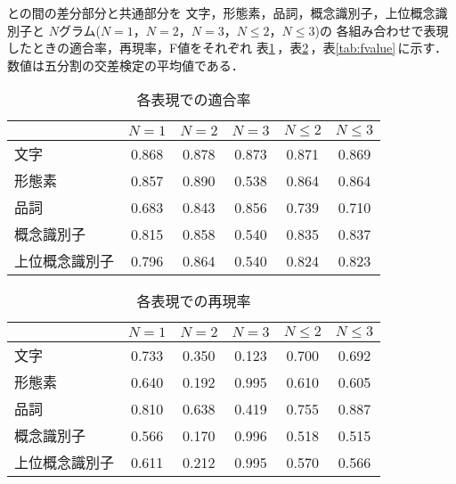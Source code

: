 {\CT}と{\NT}の間の差分部分と共通部分を
文字，形態素，品詞，概念識別子，上位概念識別子と
$N$グラム($N = 1$，$N = 2$，$N = 3$，$N \le 2$，$N \le 3$)の
各組み合わせで表現したときの適合率，再現率，F値をそれぞれ
表\ref{tab:pre}\,，表\ref{tab:rec}\,，表\ref{tab:fvalue}\,に示す． 
数値は五分割の交差検定の平均値である．
\begin{table}[htbp]
\caption{各表現での適合率}
\label{tab:pre}
\begin{center}
\begin{tabular}{|l|c|c|c|c|c|}\hline
& $N = 1$ & $N = 2$ & $N = 3$ & $N \le 2$ & $N \le 3$ \\\hline
文字           & 0.868 & 0.878 & 0.873 & 0.871 & 0.869 \\
形態素         & 0.857 & 0.890 & 0.538 & 0.864 & 0.864 \\
品詞           & 0.683 & 0.843 & 0.856 & 0.739 & 0.710 \\
概念識別子     & 0.815 & 0.858 & 0.540 & 0.835 & 0.837 \\
上位概念識別子 & 0.796 & 0.864 & 0.540 & 0.824 & 0.823 \\\hline
\end{tabular}
\end{center}
\end{table}
\begin{table}[htbp]
\caption{各表現での再現率}
\label{tab:rec}
\begin{center}
\begin{tabular}{|l|c|c|c|c|c|}\hline
& $N = 1$ & $N = 2$ & $N = 3$ & $N \le 2$ & $N \le 3$ \\\hline
文字           & 0.733 & 0.350 & 0.123 & 0.700 & 0.692 \\
形態素         & 0.640 & 0.192 & 0.995 & 0.610 & 0.605 \\
品詞           & 0.810 & 0.638 & 0.419 & 0.755 & 0.887 \\
概念識別子     & 0.566 & 0.170 & 0.996 & 0.518 & 0.515 \\
上位概念識別子 & 0.611 & 0.212 & 0.995 & 0.570 & 0.566 \\\hline
\end{tabular}
\end{center}
\end{table}

